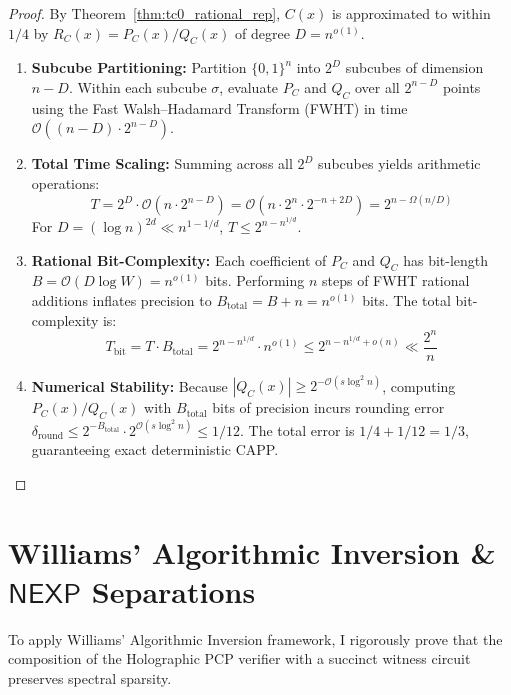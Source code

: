 \documentclass[11pt,a4paper]{article}
\theoremstyle{definition}
\theoremstyle{remark}
\newcommand{\NEXP}{\mathsf{NEXP}}
\begin{document}
\begin{proof}
By Theorem~\ref{thm:tc0_rational_rep}, $C(x)$ is approximated to within $1/4$ by $R_C(x) = P_C(x) / Q_C(x)$ of degree $D = n^{o(1)}$.
\begin{enumerate}
    \item \textbf{Subcube Partitioning:} Partition $\{0,1\}^n$ into $2^D$ subcubes of dimension $n - D$. Within each subcube $\sigma$, evaluate $P_C$ and $Q_C$ over all $2^{n-D}$ points using the Fast Walsh--Hadamard Transform (FWHT) in time $\mathcal{O}((n-D) \cdot 2^{n-D})$.
    \item \textbf{Total Time Scaling:} Summing across all $2^D$ subcubes yields arithmetic operations:
    \[
    T = 2^D \cdot \mathcal{O}(n \cdot 2^{n-D}) = \mathcal{O}(n \cdot 2^n \cdot 2^{-n + 2D}) = 2^{n - \Omega(n/D)}
    \]
    For $D = (\log n)^{2d} \ll n^{1 - 1/d}$, $T \le 2^{n - n^{1/d}}$.
    \item \textbf{Rational Bit-Complexity:} Each coefficient of $P_C$ and $Q_C$ has bit-length $B = \mathcal{O}(D \log W) = n^{o(1)}$ bits. Performing $n$ steps of FWHT rational additions inflates precision to $B_{\mathrm{total}} = B + n = n^{o(1)}$ bits. The total bit-complexity is:
    \[
    T_{\mathrm{bit}} = T \cdot B_{\mathrm{total}} = 2^{n - n^{1/d}} \cdot n^{o(1)} \le 2^{n - n^{1/d} + o(n)} \ll \frac{2^n}{n}
    \]
    \item \textbf{Numerical Stability:} Because $|Q_C(x)| \ge 2^{-\mathcal{O}(s \log^2 n)}$, computing $P_C(x)/Q_C(x)$ with $B_{\mathrm{total}}$ bits of precision incurs rounding error $\delta_{\mathrm{round}} \le 2^{-B_{\mathrm{total}}} \cdot 2^{\mathcal{O}(s \log^2 n)} \le 1/12$. The total error is $1/4 + 1/12 = 1/3$, guaranteeing exact deterministic CAPP.
\end{enumerate}
\end{proof}

\section{Williams' Algorithmic Inversion & $\NEXP$ Separations}\label{sec:master_separation}

To apply Williams' Algorithmic Inversion framework, I rigorously prove that the composition of the Holographic PCP verifier with a succinct witness circuit preserves spectral sparsity.
\end{document}
